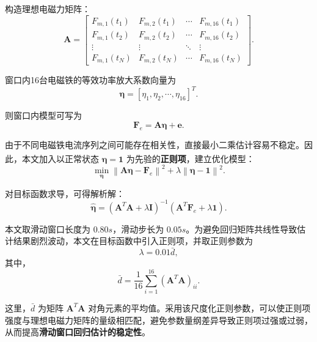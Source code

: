 \documentclass[a4paper]{nmmcm}
\newcommand{\upcite}[1]{\textsuperscript{\cite{#1}}}
\begin{document}
构造理想电磁力矩阵：
\begin{equation}
\mathbf{A}=
\begin{bmatrix}
F_{m,1}(t_1) & F_{m,2}(t_1) & \cdots & F_{m,16}(t_1)\\
F_{m,1}(t_2) & F_{m,2}(t_2) & \cdots & F_{m,16}(t_2)\\
\vdots & \vdots & \ddots & \vdots\\
F_{m,1}(t_N) & F_{m,2}(t_N) & \cdots & F_{m,16}(t_N)
\end{bmatrix}.
\end{equation}

窗口内16台电磁铁的等效功率放大系数向量为
\begin{equation}
\boldsymbol{\eta}=
[\eta_1,\eta_2,\cdots,\eta_{16}]^T.
\end{equation}

则窗口内模型可写为
\begin{equation}
\mathbf{F}_e=\mathbf{A}\boldsymbol{\eta}+\mathbf{e}.
\end{equation}

由于不同电磁铁电流序列之间可能存在相关性，直接最小二乘估计容易不稳定。因此，本文加入以正常状态 $\boldsymbol{\eta}=\mathbf{1}$ 为先验的\textbf{正则项}，建立优化模型\upcite{9}\upcite{10}：
\begin{equation}
\min_{\boldsymbol{\eta}}
\left\|\mathbf{A}\boldsymbol{\eta}-\mathbf{F}_e\right\|^2
+\lambda\left\|\boldsymbol{\eta}-\mathbf{1}\right\|^2.
\end{equation}

对目标函数求导，可得解析解：
\begin{equation}
\hat{\boldsymbol{\eta}}
=
(\mathbf{A}^T\mathbf{A}+\lambda\mathbf{I})^{-1}
(\mathbf{A}^T\mathbf{F}_e+\lambda\mathbf{1}).
\end{equation}

本文取滑动窗口长度为 $0.80s$，滑动步长为 $0.05s$。为避免回归矩阵共线性导致估计结果剧烈波动，本文在目标函数中引入正则项，并取正则参数为
\begin{equation}
\lambda=0.01\bar{d},
\end{equation}
其中，
\begin{equation}
\bar{d}=\frac{1}{16}\sum_{i=1}^{16}(\mathbf{A}^{T}\mathbf{A})_{ii}.
\end{equation}

这里，$\bar{d}$ 为矩阵 $\mathbf{A}^{T}\mathbf{A}$ 对角元素的平均值。采用该尺度化正则参数，可以使正则项强度与理想电磁力矩阵的量级相匹配，避免参数量纲差异导致正则项过强或过弱，从而提高\textbf{滑动窗口回归估计的稳定性}。
\end{document}

